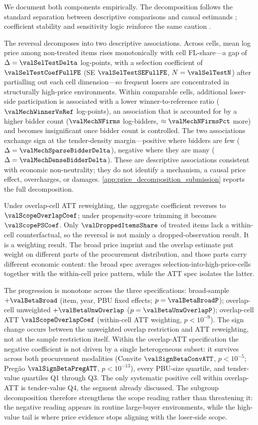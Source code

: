 We document both components empirically. The decomposition
follows the standard separation between descriptive comparisons
and causal estimands \citep{imbens2015causal}; coefficient
stability and sensitivity logic reinforce the same caution
\citep{oster2019unobservable,cinelli2020making}.

The reversal decomposes into two descriptive associations. Across
cells, mean log price among non-treated items rises monotonically
with cell FL-share---a gap of $\Delta=\valSelTestDelta$ log-points,
with a selection coefficient of $\valSelTestCoefFullFE$
(SE $\valSelTestSEFullFE$, $N=\valSelTestN$) after partialling out
each cell dimension---so frequent losers are concentrated in
structurally high-price environments. Within comparable cells,
additional loser-side participation is associated with a lower
winner-to-reference ratio ($\valMechWinnerVsRef$ log-points), an
association that is accounted for by a higher bidder count
($\valMechNFirms$ log-bidders, $\approx\valMechNFirmsPct$ more) and
becomes insignificant once bidder count is controlled. The two
associations exchange sign at the tender-density margin---positive
where bidders are few ($\Delta=\valMechSparseBidderDelta$), negative
where they are many ($\Delta=\valMechDenseBidderDelta$). These are
descriptive associations consistent with economic non-neutrality;
they do not identify a mechanism, a causal price effect,
overcharges, or damages.
\ref{app:price_decomposition_submission} reports the full
decomposition.

Under overlap-cell ATT reweighting, the aggregate coefficient
reverses to $\valScopeOverlapCoef$; under propensity-score
trimming it becomes $\valScopePSCoef$. Only
$\valDroppedItemsShare$ of treated items lack a within-cell
counterfactual, so the reversal is not mainly a
dropped-observation result. It is a weighting result. The broad
price imprint and the overlap estimate put weight on different
parts of the procurement distribution, and those parts carry
different economic content: the broad spec averages
selection-into-high-price-cells together with the within-cell
price pattern, while the ATT spec isolates the latter.

The progression is monotone across the three specifications:
broad-sample $+\valBetaBroad$ (item, year, PBU fixed effects;
$p=\valBetaBroadP$); overlap-cell unweighted $+\valBetaUnwOverlap$
($p=\valBetaUnwOverlapP$); overlap-cell ATT $\valScopeOverlapCoef$
(within-cell ATT weighting, $p<10^{-9}$). The sign change occurs
between the unweighted overlap restriction and ATT reweighting,
not at the sample restriction itself. Within the overlap-ATT
specification the negative coefficient is not driven by a single
heterogeneous subset: it survives across both procurement
modalities (Convite $\valSignBetaConvATT$, $p<10^{-5}$; Pregão
$\valSignBetaPregATT$, $p<10^{-13}$), every PBU-size quartile, and
tender-value quartiles Q1 through Q3. The only systematic
positive cell within overlap-ATT is tender-value Q4, the segment
already discussed. The subgroup decomposition therefore
strengthens the scope reading rather than threatening it: the
negative reading appears in routine large-buyer environments,
while the high-value tail is where price evidence stops aligning
with the loser-side scope.

